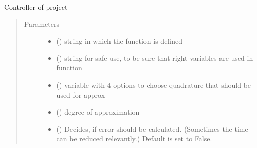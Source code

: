 \documentclass[letterpaper,10pt,english]{sphinxmanual}
\begin{document}
\begin{fulllineitems}
\label{\detokenize{index:Studienprojekt_Smolyak_qmc_one_point.controller_smolyak}}
Controller of project
\begin{quote}\begin{description}
\item[{Parameters}] \leavevmode\begin{itemize}
\item {} 
 () \textendash{} string in which the function is defined

\item {} 
 () \textendash{} string for safe use, to be sure that right variables are used in function

\item {} 
 () \textendash{} variable with 4 options to choose quadrature that should be used for approx

\item {} 
 () \textendash{} degree of approximation

\item {} 
 (\sphinxstyleliteralemphasis{\sphinxupquote{, }}) \textendash{} Decides, if error should be calculated. (Sometimes the time can be reduced
relevantly.) Default is set to False.


\end{itemize}
\end{description}
\end{quote}
\end{fulllineitems}
\end{document}
